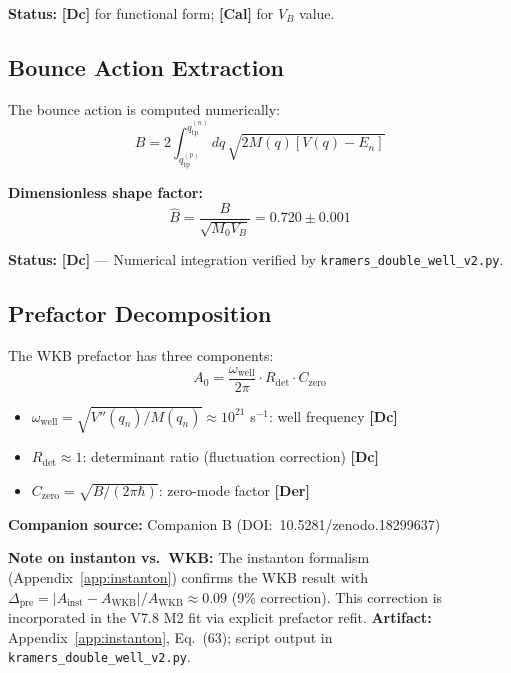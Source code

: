 \documentclass[11pt,a4paper]{article}
\newcommand{\tagDc}{\textcolor{blue!70!black}{\textbf{[Dc]}}}
\newcommand{\tagDer}{\textcolor{green!50!black}{\textbf{[Der]}}}
\newcommand{\tagCal}{\textcolor{purple!70!black}{\textbf{[Cal]}}}
\begin{document}
\textbf{Status:} \tagDc{} for functional form; \tagCal{} for $V_B$ value.

\subsection{Bounce Action Extraction}

The bounce action is computed numerically:
\begin{equation}
    B = 2 \int_{q_{\text{tp}}^{(p)}}^{q_{\text{tp}}^{(n)}} dq \, \sqrt{2 M(q) \left[ V(q) - E_n \right]}
\end{equation}

\textbf{Dimensionless shape factor:}
\begin{equation}
    \hat{B} = \frac{B}{\sqrt{M_0 V_B}} = 0.720 \pm 0.001
\end{equation}

\textbf{Status:} \tagDc{} --- Numerical integration verified by \texttt{kramers\_double\_well\_v2.py}.

\subsection{Prefactor Decomposition}

The WKB prefactor has three components:
\begin{equation}
    A_0 = \frac{\omega_{\text{well}}}{2\pi} \cdot R_{\text{det}} \cdot C_{\text{zero}}
\end{equation}

\begin{itemize}[nosep]
    \item $\omega_{\text{well}} = \sqrt{V''(q_n)/M(q_n)} \approx 10^{21}$ s$^{-1}$: well frequency \tagDc{}
    \item $R_{\text{det}} \approx 1$: determinant ratio (fluctuation correction) \tagDc{}
    \item $C_{\text{zero}} = \sqrt{B/(2\pi\hbar)}$: zero-mode factor \tagDer{}
\end{itemize}

\textbf{Companion source:} Companion B (DOI:~10.5281/zenodo.18299637)

\textbf{Note on instanton vs.~WKB:} The instanton formalism (Appendix~\ref{app:instanton}) confirms the WKB result with $\Delta_{\text{pre}} = |A_{\text{inst}} - A_{\text{WKB}}|/A_{\text{WKB}} \approx 0.09$ (9\% correction). This correction is incorporated in the V7.8 M2 fit via explicit prefactor refit. \textbf{Artifact:} Appendix~\ref{app:instanton}, Eq.~(63); script output in \texttt{kramers\_double\_well\_v2.py}.
\end{document}
